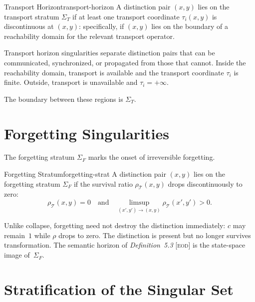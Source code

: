 \documentclass[12pt,twoside,openright]{book}
\newcommand{\transfam}{\mathcal{T}}       %
\newcommand{\survRatio}{\rho}             %
\newcommand{\collapseInd}{c}             %
\newcommand{\EOD}[1]{\textit{#1} [\textsc{eod}]}
\newcommand{\strataT}{\Sigma_{T}}   %
\newcommand{\strataF}{\Sigma_{F}}   %
\providecommand{\strataT}{\Sigma_{T}}
\providecommand{\strataF}{\Sigma_{F}}
\begin{document}
\begin{definition}{Transport Horizon}{transport-horizon}
A distinction pair $(x,y)$ lies on the transport stratum
$\strataT$ if at least one transport coordinate $\tau_i(x,y)$
is discontinuous at $(x,y)$: specifically, if
$(x,y)$ lies on the boundary of a reachability domain for the
relevant transport operator.
\end{definition}

Transport horizon singularities separate distinction pairs that
can be communicated, synchronized, or propagated from those
that cannot. Inside the reachability domain, transport is
available and the transport coordinate $\tau_i$ is finite.
Outside, transport is unavailable and $\tau_i=+\infty$.

The boundary between these regions is $\strataT$.

\section{Forgetting Singularities}

The forgetting stratum $\strataF$ marks the onset of
irreversible forgetting.

\begin{definition}{Forgetting Stratum}{forgetting-strat}
A distinction pair $(x,y)$ lies on the forgetting stratum
$\strataF$ if the survival ratio $\survRatio_\transfam(x,y)$
drops discontinuously to zero:
\[
  \survRatio_\transfam(x,y)=0
  \quad\text{and}\quad
  \limsup_{(x',y')\to(x,y)}\survRatio_\transfam(x',y')>0.
\]
\end{definition}

Unlike collapse, forgetting need not destroy the distinction
immediately: $\collapseInd$ may remain~$1$ while $\survRatio$
drops to zero. The distinction is present but no longer
survives transformation. The semantic horizon of
\EOD{Definition~5.3} is the state-space image of~$\strataF$.

\section{Stratification of the Singular Set}
\label{sec:stratum-intersections}
\end{document}
